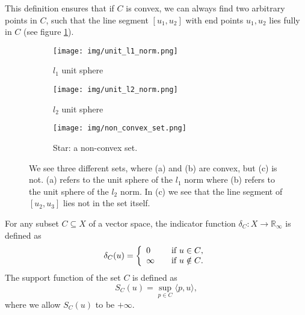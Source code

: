     This definition ensures that if $C$ is convex, we can always find two arbitrary points in $C$, such that the line segment $[u_{1}, u_{2}]$ with end points $u_{1}, u_{2}$ lies fully in $C$ (see figure \ref{fig:convex_and_non_convex_sets}).
    \begin{figure}[ht]
        \centering
        \begin{subfigure}[b]{0.3\textwidth}
            \texttt{[image: img/unit\_l1\_norm.png]}
            \caption{$l_{1}$ unit sphere}
        \end{subfigure}
        \begin{subfigure}[b]{0.3\textwidth}
            \texttt{[image: img/unit\_l2\_norm.png]}
            \caption{$l_{2}$ unit sphere}
        \end{subfigure}
        \begin{subfigure}[b]{0.3\textwidth}
            \texttt{[image: img/non\_convex\_set.png]}
            \caption{Star: a non-convex set.}
        \end{subfigure}
        \caption{We see three different sets, where (a) and (b) are convex, but (c) is not. (a) refers to the unit sphere of the $l_{1}$ norm where (b) refers to the unit sphere of the $l_{2}$ norm. In (c) we see that the line segment of $[u_{2}, u_{3}]$ lies not in the set itself.}
        \label{fig:convex_and_non_convex_sets}
    \end{figure}

    \begin{definition} %
    \label{def:indicator_function}

        For any subset $C \subseteq X$ of a vector space, the indicator function $\delta_{C}: X \longrightarrow \mathbb{R}_{\infty}$ is defined as
            \begin{equation}
                \delta_{C}(u) =
                \left\{
                    \begin{array}{l l}
                      0      & \quad \text{if $u \in C$}, \\
                      \infty & \quad \text{if $u \notin C$}.
                    \end{array}
                \right.
            \label{eq:indicator_function}
            \end{equation}
        The support function of the set $C$ is defined as
            \begin{equation}
                S_{C}(u) = \sup_{p \in C} \langle p, u \rangle,
            \label{eq:support_function}
            \end{equation}
        where we allow $S_{C}(u)$ to be $+\infty$.
 
    \end{definition}


